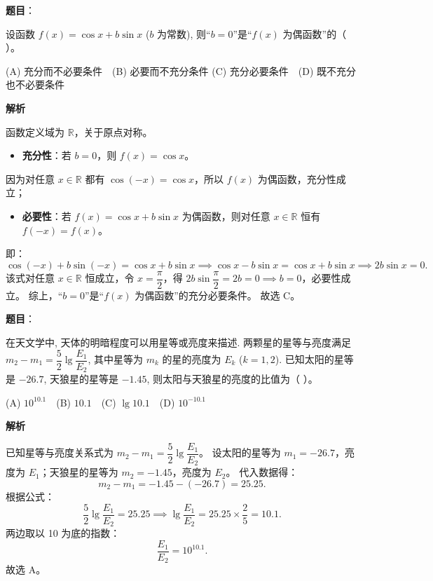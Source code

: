 \begin{answer}

\textbf{题目}：

设函数 $f(x) = \cos x + b \sin x$ ($b$ 为常数), 则“$b = 0$”是“$f(x)$ 为偶函数”的（ ）。

(A) 充分而不必要条件　(B) 必要而不充分条件
(C) 充分必要条件　(D) 既不充分也不必要条件

\textbf{解析}

函数定义域为 $\mathbb{R}$，关于原点对称。
\begin{itemize}
\item \textbf{充分性}：若 $b = 0$，则 $f(x) = \cos x$。
\end{itemize}
  因为对任意 $x \in \mathbb{R}$ 都有 $\cos(-x) = \cos x$，所以 $f(x)$ 为偶函数，充分性成立；
\begin{itemize}
\item \textbf{必要性}：若 $f(x) = \cos x + b \sin x$ 为偶函数，则对任意 $x \in \mathbb{R}$ 恒有 $f(-x) = f(x)$。
\end{itemize}
  即：
\nopagebreak[4]
\[\cos(-x) + b \sin(-x) = \cos x + b \sin x \implies \cos x - b \sin x = \cos x + b \sin x \implies 2b \sin x = 0.\]
  该式对任意 $x \in \mathbb{R}$ 恒成立，令 $x = \dfrac{\pi}{2}$，得 $2b \sin \dfrac{\pi}{2} = 2b = 0 \implies b = 0$，必要性成立。
综上，“$b = 0$”是“$f(x)$ 为偶函数”的充分必要条件。
故选 C。


\end{answer}
\begin{answer}

\textbf{题目}：

在天文学中, 天体的明暗程度可以用星等或亮度来描述. 两颗星的星等与亮度满足 $m_2 - m_1 = \dfrac{5}{2}\lg \dfrac{E_1}{E_2}$, 其中星等为 $m_k$ 的星的亮度为 $E_k$ ($k = 1, 2$). 已知太阳的星等是 $-26.7$, 天狼星的星等是 $-1.45$, 则太阳与天狼星的亮度的比值为（ ）。

(A) $10^{10.1}$　(B) $10.1$　(C) $\lg 10.1$　(D) $10^{-10.1}$

\textbf{解析}

已知星等与亮度关系式为 $m_2 - m_1 = \dfrac{5}{2}\lg \dfrac{E_1}{E_2}$。
设太阳的星等为 $m_1 = -26.7$，亮度为 $E_1$；天狼星的星等为 $m_2 = -1.45$，亮度为 $E_2$。
代入数据得：
\nopagebreak[4]
\[m_2 - m_1 = -1.45 - (-26.7) = 25.25.\]
根据公式：
\nopagebreak[4]
\[\dfrac{5}{2}\lg \dfrac{E_1}{E_2} = 25.25 \implies \lg \dfrac{E_1}{E_2} = 25.25 \times \dfrac{2}{5} = 10.1.\]
两边取以 10 为底的指数：
\nopagebreak[4]
\[\dfrac{E_1}{E_2} = 10^{10.1}.\]
故选 A。


\end{answer}
